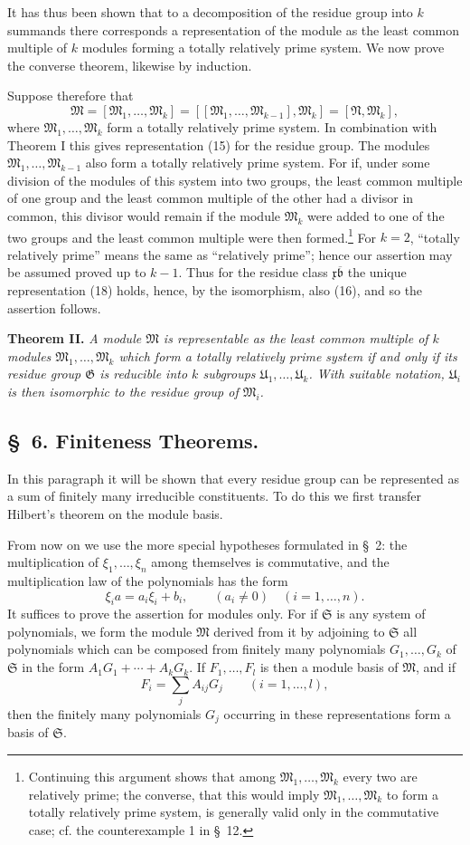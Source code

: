 \documentclass[11pt]{article}
\newcommand{\mM}{\mathfrak{M}}
\newcommand{\mN}{\mathfrak{N}}
\newcommand{\mG}{\mathfrak{G}}
\newcommand{\mb}{\mathfrak{b}}
\newcommand{\mx}{\mathfrak{x}}
\providecommand{\mU}{\mathfrak{U}}
\providecommand{\mS}{\mathfrak{S}}
\begin{document}
It has thus been shown that to a decomposition of the residue group into $k$ summands there corresponds a representation of the module as the least common multiple of $k$ modules forming a totally relatively prime system. We now prove the converse theorem, likewise by induction.

Suppose therefore that
\[
 \mM=[\mM_1,\ldots,\mM_k]=[[\mM_1,\ldots,\mM_{k-1}],\mM_k]=[\mN,\mM_k],
\]
where $\mM_1,
\ldots,\mM_k$ form a totally relatively prime system. In combination with Theorem I this gives representation (15) for the residue group. The modules $\mM_1,
\ldots,\mM_{k-1}$ also form a totally relatively prime system. For if, under some division of the modules of this system into two groups, the least common multiple of one group and the least common multiple of the other had a divisor in common, this divisor would remain if the module $\mM_k$ were added to one of the two groups and the least common multiple were then formed.\footnote{Continuing this argument shows that among $\mM_1,
\ldots,\mM_k$ every two are relatively prime; the converse, that this would imply $\mM_1,
\ldots,\mM_k$ to form a totally relatively prime system, is generally valid only in the commutative case; cf. the counterexample 1 in \S~12.} For $k=2$, ``totally relatively prime'' means the same as ``relatively prime''; hence our assertion may be assumed proved up to $k-1$. Thus for the residue class $\mx\overline{\mb}$ the unique representation (18) holds, hence, by the isomorphism, also (16), and so the assertion follows.

\textbf{Theorem II.} \emph{A module $\mM$ is representable as the least common multiple of $k$ modules $\mM_1,
\ldots,\mM_k$ which form a totally relatively prime system if and only if its residue group $\mG$ is reducible into $k$ subgroups $\mU_1,
\ldots,\mU_k$. With suitable notation, $\mU_i$ is then isomorphic to the residue group of $\mM_i$.}

\subsection*{\S~6. Finiteness Theorems.}

In this paragraph it will be shown that every residue group can be represented as a sum of finitely many irreducible constituents. To do this we first transfer Hilbert's theorem on the module basis.

From now on we use the more special hypotheses formulated in \S~2: the multiplication of $\xi_1,
\ldots,\xi_n$ among themselves is commutative, and the multiplication law of the polynomials has the form
\begin{equation}
 \xi_i a=a_i\xi_i+b_i,
 \qquad (a_i\ne0)\quad(i=1,\ldots,n).
\tag{6}
\end{equation}
It suffices to prove the assertion for modules only. For if $\mS$ is any system of polynomials, we form the module $\mM$ derived from it by adjoining to $\mS$ all polynomials which can be composed from finitely many polynomials $G_1,
\ldots,G_k$ of $\mS$ in the form $A_1G_1+
\cdots+A_kG_k$. If $F_1,
\ldots,F_l$ is then a module basis of $\mM$, and if
\[
 F_i=\sum_j A_{ij}G_j\qquad(i=1,\ldots,l),
\]
then the finitely many polynomials $G_j$ occurring in these representations form a basis of $\mS$.
\end{document}
